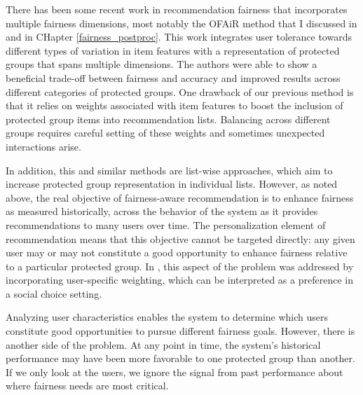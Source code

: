 There has been some recent work in recommendation fairness that incorporates multiple fairness dimensions, most notably the OFAiR method that I discussed in \cite{sonboli-umap-2020} and in CHapter \ref{fairness_postproc}. This work integrates user tolerance towards different types of variation in item features with a representation of protected groups that spans multiple dimensions. The authors were able to show a beneficial trade-off between fairness and accuracy and improved results across different categories of protected groups. One drawback of our previous method \cite{sonboli-umap-2020} is that it relies on weights associated with item features to boost the inclusion of protected group items into recommendation lists. Balancing across different groups requires careful setting of these weights and sometimes unexpected interactions arise.

In addition, this and similar methods are list-wise approaches, which aim to increase protected group representation in individual lists. However, as noted above, the real objective of fairness-aware recommendation is to enhance fairness as measured historically, across the behavior of the system as it provides recommendations to many users over time. The personalization element of recommendation means that this objective cannot be targeted directly: any given user may or may not constitute a good opportunity to enhance fairness relative to a particular protected group. In \cite{sonboli-umap-2020}, this aspect of the problem was addressed by incorporating user-specific weighting, which can be interpreted as a preference in a social choice setting. 

Analyzing user characteristics enables the system to determine which users constitute good opportunities to pursue different fairness goals. However, there is another side of the problem. At any point in time, the system's historical performance may have been more favorable to one protected group than another. If we only look at the users, we ignore the signal from past performance about where fairness needs are most critical.



